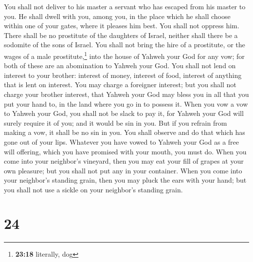  You shall not deliver to his master a servant who has
escaped from his master to you.  He shall dwell with you,
among you, in the place which he shall choose within one of your gates,
where it pleases him best. You shall not oppress him. 
There shall be no prostitute of the daughters of Israel, neither shall
there be a sodomite of the sons of Israel.  You shall not
bring the hire of a prostitute, or the wages of a male
prostitute,\footnote{\textbf{23:18} literally, dog} into the house of
Yahweh your God for any vow; for both of these are an abomination to
Yahweh your God.  You shall not lend on interest to your
brother: interest of money, interest of food, interest of anything that
is lent on interest.  You may charge a foreigner
interest; but you shall not charge your brother interest, that Yahweh
your God may bless you in all that you put your hand to, in the land
where you go in to possess it.  When you vow a vow to
Yahweh your God, you shall not be slack to pay it, for Yahweh your God
will surely require it of you; and it would be sin in you.
 But if you refrain from making a vow, it shall be no sin
in you.  You shall observe and do that which has gone out
of your lips. Whatever you have vowed to Yahweh your God as a free will
offering, which you have promised with your mouth, you must do.
 When you come into your neighbor's vineyard, then you
may eat your fill of grapes at your own pleasure; but you shall not put
any in your container.  When you come into your
neighbor's standing grain, then you may pluck the ears with your hand;
but you shall not use a sickle on your neighbor's standing grain.

\hypertarget{section-23}{%
\section{24}\label{section-23}}

